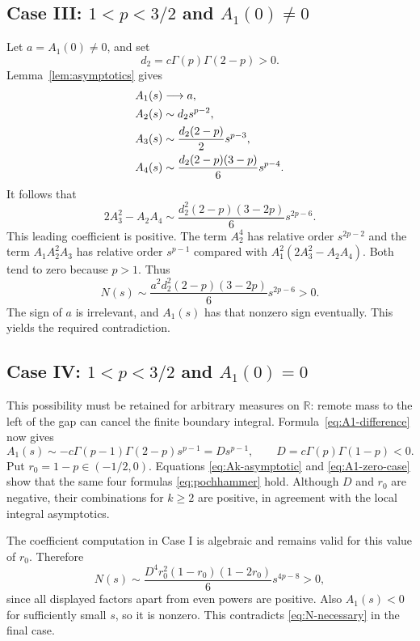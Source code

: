 \documentclass[11pt,a4paper]{article}
\theoremstyle{definition}
\theoremstyle{remark}
\newcommand{\R}{\mathbb R}
\begin{document}
\subsection{Case III: \texorpdfstring{$1<p<3/2$ and $A_1(0)\ne0$}{1 < p < 3/2 and A1(0) nonzero}}

Let $a=A_1(0)\ne0$, and set
\[
 d_2=c\Gamma(p)\Gamma(2-p)>0.
\]
Lemma~\ref{lem:asymptotics} gives
\begin{align}
 A_1(s)&\longrightarrow a,\notag\\
 A_2(s)&\sim d_2s^{p-2},\notag\\
 A_3(s)&\sim\frac{d_2(2-p)}2s^{p-3},\label{eq:case-III-A}\\
 A_4(s)&\sim\frac{d_2(2-p)(3-p)}6s^{p-4}.\notag
\end{align}
It follows that
\[
 2A_3^2-A_2A_4
 \sim\frac{d_2^2(2-p)(3-2p)}6s^{2p-6}.
\]
This leading coefficient is positive. The term $A_2^4$ has
relative order $s^{2p-2}$ and the term $A_1A_2^2A_3$ has relative
order $s^{p-1}$ compared with $A_1^2(2A_3^2-A_2A_4)$. Both tend
to zero because $p>1$. Thus
\begin{equation}\label{eq:N-case-III}
 N(s)\sim
 \frac{a^2d_2^2(2-p)(3-2p)}6s^{2p-6}>0.
\end{equation}
The sign of $a$ is irrelevant, and $A_1(s)$ has that nonzero
sign eventually. This yields the required contradiction.

\subsection{Case IV: \texorpdfstring{$1<p<3/2$ and $A_1(0)=0$}{1 < p < 3/2 and A1(0) = 0}}

This possibility must be retained for arbitrary measures on $\R$:
remote mass to the left of the gap can cancel the finite boundary
integral. Formula~\eqref{eq:A1-difference} now gives
\begin{equation}\label{eq:A1-zero-case}
 A_1(s)\sim
 -c\Gamma(p-1)\Gamma(2-p)s^{p-1}
 =Ds^{p-1},
 \qquad D=c\Gamma(p)\Gamma(1-p)<0.
\end{equation}
Put $r_0=1-p\in(-1/2,0)$. Equations
\eqref{eq:Ak-asymptotic} and \eqref{eq:A1-zero-case} show that
the same four formulas \eqref{eq:pochhammer} hold. Although $D$
and $r_0$ are negative, their combinations for $k\ge2$ are positive,
in agreement with the local integral asymptotics.

The coefficient computation in Case I is algebraic and remains
valid for this value of $r_0$. Therefore
\begin{equation}\label{eq:N-case-IV}
 N(s)\sim
 \frac{D^4r_0^2(1-r_0)(1-2r_0)}6s^{4p-8}>0,
\end{equation}
since all displayed factors apart from even powers are positive.
Also $A_1(s)<0$ for sufficiently small $s$, so it is nonzero.
This contradicts \eqref{eq:N-necessary} in the final case.
\end{document}
